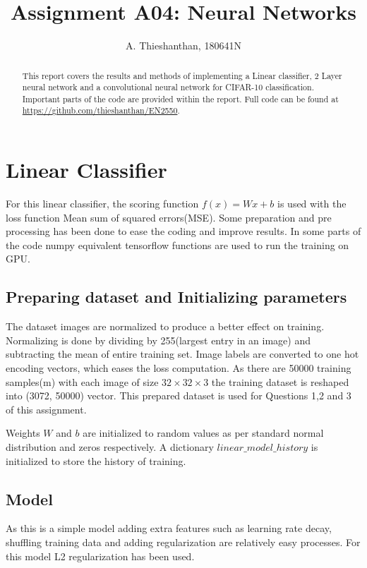 \documentclass[a4paper, 12pt]{article}
\title{Assignment A04: Neural Networks}
\author{A. Thieshanthan, 180641N}
\begin{document}
	\maketitle
	\begin{abstract}
		This report covers the results and methods of implementing a Linear classifier, 2 Layer neural network and a convolutional neural network for  CIFAR-10 classification. Important parts of the code are provided within the report. Full code can be found at \url{https://github.com/thieshanthan/EN2550}.
	\end{abstract}
	\section{Linear Classifier}
		For this linear classifier, the scoring function $f(x)=Wx+b$ is used with the loss function Mean sum of squared errors(MSE). Some preparation and pre processing has been done to ease the coding and improve results. In some parts of the code numpy equivalent tensorflow functions are used to run the training on GPU.
		\subsection{Preparing dataset and Initializing parameters}
			The dataset images are normalized to produce a better effect on training. Normalizing is done by dividing by 255(largest entry in an image) and subtracting the mean of entire training set. Image labels are converted to one hot encoding vectors, which eases the loss computation. As there are 50000 training samples(m) with each image of size $32 \times 32\times 3$ the training dataset is reshaped into (3072, 50000) vector. This prepared dataset is used for Questions 1,2 and 3 of this assignment.
			\par 
			Weights $W$ and $b$ are initialized to random values as per standard normal distribution and zeros respectively. A dictionary $linear\_model\_history$ is initialized to store the history of training.
		\subsection{Model}
			As this is a simple model adding extra features such as learning rate decay, shuffling training data and adding regularization are relatively easy processes. For this model L2 regularization has been used. 
			
\end{document}
